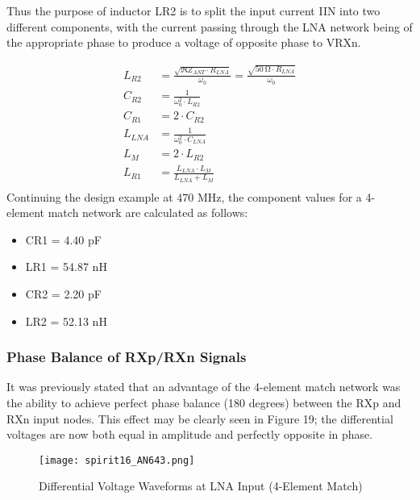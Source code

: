         Thus the purpose of inductor LR2 is to split the input current IIN into two different 
        components, with the current passing through the LNA network being of the appropriate phase 
        to produce a voltage of opposite phase to VRXn.
        
        \begin{align}
          L_{R2}  &= \frac{\sqrt{\Re{Z_{ANT}}\cdot R_{LNA}}}{\omega_0} 
                   = \frac{\sqrt{\SI{50}{\ohm}\cdot R_{LNA}}}{\omega_0} 
                   \label{EXP001:eq_spirit20}   \\ 
          C_{R2}  &= \frac{1}{\omega_0^2\cdot L_{R2}}          \label{EXP001:eq_spirit21}   \\ 
          C_{R1}  &= 2\cdot C_{R2}                             \label{EXP001:eq_spirit22}   \\ 
          L_{LNA} &= \frac{1}{\omega_0^2\cdot C_{LNA}}         \label{EXP001:eq_spirit23}   \\ 
          L_{M}   &= 2\cdot L_{R2}                             \label{EXP001:eq_spirit24}   \\ 
          L_{R1}  &= \frac{L_{LNA}\cdot L_M}{L_{LNA} + L_M}    \label{EXP001:eq_spirit25}   \\ 
        \end{align}
        Continuing the design example at 470 MHz, the component values for a 4-element match 
        network are calculated as follows:
        \begin{itemize}[noitemsep]
          \item CR1 = 4.40 pF
          \item LR1 = 54.87 nH
          \item CR2 = 2.20 pF
          \item LR2 = 52.13 nH          
        \end{itemize}
        
      \subsubsection{Phase Balance of RXp/RXn Signals}
        It was previously stated that an advantage of the 4-element match network was the ability 
        to achieve perfect phase balance (180 degrees) between the RXp and RXn input nodes. This 
        effect may be clearly seen in Figure 19; the differential voltages are now both equal in 
        amplitude and perfectly opposite in phase.
        
        \begin{figure}[ht!] %
          \centering
          \texttt{[image: spirit16\_AN643.png]}
          \caption{Differential Voltage Waveforms at LNA Input (4-Element Match) 
                   \cite[s.~16]{AN643SiliconLabs}}
          \label{EXP001:fig_spirit16}
        \end{figure}
        
